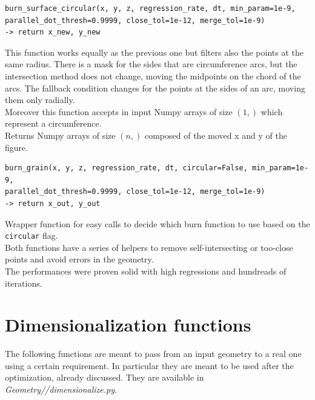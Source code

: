 \begin{verbatim}
burn_surface_circular(x, y, z, regression_rate, dt, min_param=1e-9,
parallel_dot_thresh=0.9999, close_tol=1e-12, merge_tol=1e-9)
-> return x_new, y_new
\end{verbatim}
\hspace*{2em} This function works equally as the previous one but filters also the points at the same radius. There is a mask for the sides that are circumference arcs, but the intersection method does not change, moving the midpoints on the chord of the arcs. The fallback condition changes for the points at the sides of an arc, moving them only radially.\\
Moreover this function accepts in input Numpy arrays of size $(1,)$ which represent a circumference.\\
Returns Numpy arrays of size $(n,)$ composed of the moved x and y of the figure.\\

\begin{verbatim}
burn_grain(x, y, z, regression_rate, dt, circular=False, min_param=1e-9,
parallel_dot_thresh=0.9999, close_tol=1e-12, merge_tol=1e-9)
-> return x_out, y_out
\end{verbatim}
\hspace*{2em} Wrapper function for easy calls to decide which burn function to use based on the \verb|circular| flag.\\
Both functions have a series of helpers to remove self-intersecting or too-close points and avoid errors in the geometry.\\
The performances were proven solid with high regressions and hundreads of iterations.

\section{Dimensionalization functions}
The following functions are meant to pass from an input geometry to a real one using a certain requirement. In particular they are meant to be used after the optimization, already discussed. They are available in \textit{Geometry//dimensionalize.py}.

